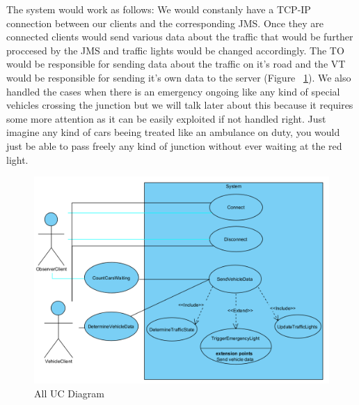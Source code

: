 \documentclass[17pt]{report}
\begin{document}
The system would work as follows: We would constanly have a TCP-IP connection
between our clients and the corresponding JMS. Once they are connected
clients would send various data about the traffic that would be further 
proccesed by the JMS and traffic lights would be changed accordingly. The
TO would be responsible for sending data about the traffic on it's road and the 
VT would be responsible for sending it's own data to the server (Figure ~\ref{fig:UC_DiagramAll}). 
We also handled the cases when there is an emergency ongoing like any kind of
special vehicles crossing the junction but we will talk later about this
because it requires some more attention as it can be easily exploited if not 
handled right. Just imagine any kind of cars beeing treated like an ambulance
on duty, you would just be able to pass freely any kind of junction without 
ever waiting at the red light.\\

\begin{figure}[h!]
    \includegraphics[width=\textwidth]{UC/UCDiagram.png}
    \caption{All UC Diagram}
    \label{fig:UC_DiagramAll}
\end{figure}

\pagebreak
\end{document}
